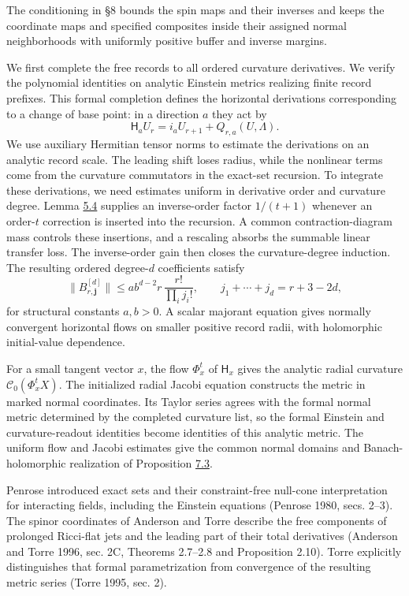 \documentclass[
  english,
  11pt,
  reqno]{amsart}
\begin{document}
The conditioning in §8 bounds the spin maps and their inverses and keeps
the coordinate maps and specified composites inside their assigned
normal neighborhoods with uniformly positive buffer and inverse margins.

We first complete the free records to all ordered curvature derivatives.
We verify the polynomial identities on analytic Einstein metrics
realizing finite record prefixes. This formal completion defines the
horizontal derivations corresponding to a change of base point: in a
direction \(a\) they act by \[
 \mathsf H_aU_r=i_aU_{r+1}+Q_{r,a}(U,\Lambda).
\] We use auxiliary Hermitian tensor norms to estimate the derivations
on an analytic record scale. The leading shift loses radius, while the
nonlinear terms come from the curvature commutators in the exact-set
recursion. To integrate these derivations, we need estimates uniform in
derivative order and curvature degree. Lemma
\hyperref[lem:es-transfer]{5.4} supplies an inverse-order factor
\(1/(t+1)\) whenever an order-\(t\) correction is inserted into the
recursion. A common contraction-diagram mass controls these insertions,
and a rescaling absorbs the summable linear transfer loss. The
inverse-order gain then closes the curvature-degree induction. The
resulting ordered degree-\(d\) coefficients satisfy \[
 \|B^{[d]}_{r,\mathbf j}\|
 \le ab^{d-2}r\,\frac{r!}{\prod_i j_i!},
 \qquad j_1+\cdots+j_d=r+3-2d,
\] for structural constants \(a,b>0\). A scalar majorant equation gives
normally convergent horizontal flows on smaller positive record radii,
with holomorphic initial-value dependence.

For a small tangent vector \(x\), the flow \(\Phi_x^t\) of
\(\mathsf H_x\) gives the analytic radial curvature
\(\mathcal C_0(\Phi_x^tX)\). The initialized radial Jacobi equation
constructs the metric in marked normal coordinates. Its Taylor series
agrees with the formal normal metric determined by the completed
curvature list, so the formal Einstein and curvature-readout identities
become identities of this analytic metric. The uniform flow and Jacobi
estimates give the common normal domains and Banach-holomorphic
realization of Proposition \hyperref[prop:es-uniform-realization]{7.3}.

Penrose introduced exact sets and their constraint-free null-cone
interpretation for interacting fields, including the Einstein equations
(Penrose 1980, secs. 2--3). The spinor coordinates of Anderson and Torre
describe the free components of prolonged Ricci-flat jets and the
leading part of their total derivatives (Anderson and Torre 1996, sec.
2C, Theorems 2.7--2.8 and Proposition 2.10). Torre explicitly
distinguishes that formal parametrization from convergence of the
resulting metric series (Torre 1995, sec. 2).
\end{document}
